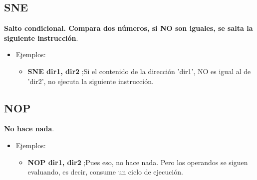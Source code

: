 \subsection{SNE}
\textbf{Salto condicional. Compara dos números, si NO son iguales, se salta la siguiente instrucción}.
\begin{itemize}
    \item Ejemplos:
    \begin{itemize}
        \item \textbf{SNE dir1, dir2} ;Si el contenido de la dirección 'dir1', NO es igual al de 'dir2', no ejecuta la siguiente instrucción.
    \end{itemize}
\end{itemize}

\subsection{NOP}
\textbf{No hace nada}.
\begin{itemize}
    \item Ejemplos:
    \begin{itemize}
        \item \textbf{NOP dir1, dir2} ;Pues eso, no hace nada. Pero los operandos se siguen evaluando, es decir, consume un ciclo de ejecución.
    \end{itemize}
\end{itemize}